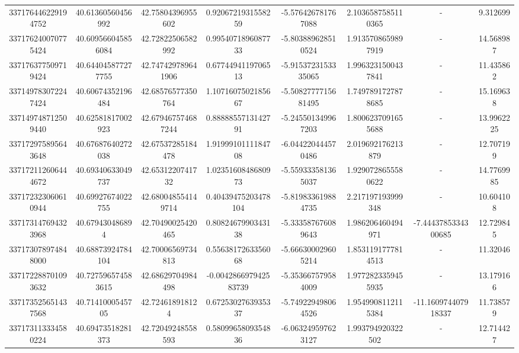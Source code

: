 \documentclass{article}
\begin{document}
\begin{landscape}
\begin{longtable}[c]{S[table-format=18.0]S[table-format=2.15]S[table-format=2.15]S[table-format=-2.17]S[table-format=-2.16]S[table-format=-2.16]S[table-format=-3.16]S[table-format=2.7]}
337176446229194752 & 40.61360560456992  & 42.75804396955602  & 0.9206721931558259    & -5.576426781767088  & 2.1036587585110365 & {-}                  & 9.312699   \\
337176240070775424 & 40.609566045856084 & 42.72822506582992  & 0.9954071896087733    & -5.803889628510524  & 1.9135708659897919 & {-}                  & 14.568987  \\
337176377509719424 & 40.644045877277755 & 42.747429789641906 & 0.6774494119706513    & -5.9153723153335065 & 1.9963231500437841 & {-}                  & 11.435862  \\
337149783072247424 & 40.60674352196484  & 42.68576577350764  & 1.1071607502185667    & -5.5082777715681495 & 1.7497891727878685 & {-}                  & 15.169638  \\
337149748712509440 & 40.62581817002923  & 42.679467574687244 & 0.8888855713142791    & -5.245501349967203  & 1.8006237091655688 & {-}                  & 13.9962225 \\
337172975895643648 & 40.67687640272038  & 42.67537285184478  & 1.9199910111184708    & -6.044220444570486  & 2.019692176213879  & {-}                  & 12.707199  \\
337172112606444672 & 40.69340633049737  & 42.6531220741732   & 1.0235160848680973    & -5.559333581365037  & 1.9290728655580622 & {-}                  & 14.7769985 \\
337172323060610944 & 40.69927674022755  & 42.680048554149714 & 0.40439475203478104   & -5.819833619884735  & 2.217197193999348  & {-}                  & 10.604108  \\
337173147694323968 & 40.679430486894    & 42.70490025420465  & 0.8082467990343138    & -5.333587676089643  & 1.986206460494971  & -7.4443785334300685 & 12.729845  \\
337173078974848000 & 40.68873924784104  & 42.70006569734813  & 0.5563817263356068    & -5.666300029605214  & 1.8531191777814513 & {-}                  & 11.32046   \\
337172288701093632 & 40.727596574583615 & 42.68629704984498  & -0.004286697942583739 & -5.353667579584009  & 1.9772823359455935 & {-}                  & 13.179166  \\
337173525651437568 & 40.7141000545705   & 42.724618918124    & 0.6725302763935337    & -5.749229498064526  & 1.9549908112115384 & -11.160974407918337 & 11.738579  \\
337173113334580224 & 40.69473518281373  & 42.72049248558593  & 0.5809965809354836    & -6.063249597623127  & 1.993794920322502  & {-}                  & 12.714427  \\

\end{longtable}
\end{landscape}
\end{document}
